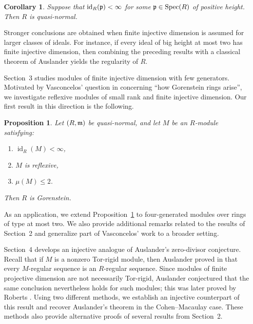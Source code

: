 \documentclass[10. pt,a4paper]{amsart}
\newtheorem{proposition}[theorem]{Proposition}
\newtheorem{corollary}[theorem]{Corollary}
\theoremstyle{definition}
\theoremstyle{remark}
\newcommand{\Spec}{\operatorname{Spec}}
\newcommand{\id}{\operatorname{id}}
\newcommand{\fm}{\frak{m}}
\newcommand{\fp}{\frak{p}}
\begin{document}
\begin{corollary}
	Suppose that $\id_R(\fp)<\infty$ for some $\fp\in\Spec(R)$ of positive height. Then $R$ is quasi-normal.
\end{corollary}

Stronger conclusions are obtained when finite injective dimension is assumed for larger classes of ideals. For instance, if every ideal of big height at most two has finite injective dimension, then combining the preceding results with a classical theorem of Auslander \cite{baus} yields the regularity of $R$.

Section~3 studies modules of finite injective dimension with few generators. Motivated by Vasconcelos' question in \cite[Page~51]{v1} concerning ``how Gorenstein rings arise'', we investigate reflexive modules of small rank and finite injective dimension. Our first result in this direction is the following.

\begin{proposition}\label{1.1}
	Let $(R,\fm)$ be quasi-normal, and let $M$ be an $R$-module satisfying:
	\begin{enumerate}
		\item[(i)] $\id_R(M)<\infty$,
		\item[(ii)] $M$ is reflexive,
		\item[(iii)] $\mu(M)\leq 2$.
	\end{enumerate}
	Then $R$ is Gorenstein.
\end{proposition}

As an application, we extend Proposition~\ref{1.1} to four-generated modules over rings of type at most two. We also provide additional remarks related to the results of Section~2 and generalize part of Vasconcelos' work \cite[2.40]{v1} to a broader setting.


\medskip
Section~4 develops an injective analogue of Auslander's zero-divisor conjecture. Recall that if $M$ is a nonzero Tor-rigid module, then Auslander proved in \cite[4.3]{au} that every $M$-regular sequence is an $R$-regular sequence. Since modules of finite projective dimension are not necessarily Tor-rigid, Auslander conjectured that the same conclusion nevertheless holds for such modules; this was later proved by Roberts \cite[6.2.3]{int1}. Using two different methods, we establish an injective counterpart of this result and recover Auslander's theorem in the Cohen--Macaulay case. These methods also provide alternative proofs of several results from Section~2.

\medskip
 
\end{document}
